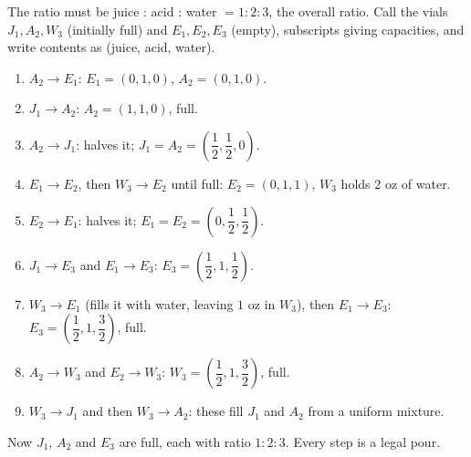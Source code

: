 The ratio must be juice : acid : water $=1:2:3$, the overall ratio. Call the vials $J_1,A_2,W_3$ (initially full) and $E_1,E_2,E_3$ (empty), subscripts giving capacities, and write contents as (juice, acid, water).
\begin{enumerate}
\item $A_2\to E_1$: $E_1=(0,1,0)$, $A_2=(0,1,0)$.
\item $J_1\to A_2$: $A_2=(1,1,0)$, full.
\item $A_2\to J_1$: halves it; $J_1=A_2=(\dfrac12,\dfrac12,0)$.
\item $E_1\to E_2$, then $W_3\to E_2$ until full: $E_2=(0,1,1)$, $W_3$ holds $2$ oz of water.
\item $E_2\to E_1$: halves it; $E_1=E_2=(0,\dfrac12,\dfrac12)$.
\item $J_1\to E_3$ and $E_1\to E_3$: $E_3=(\dfrac12,1,\dfrac12)$.
\item $W_3\to E_1$ (fills it with water, leaving $1$ oz in $W_3$), then $E_1\to E_3$: $E_3=(\dfrac12,1,\dfrac32)$, full.
\item $A_2\to W_3$ and $E_2\to W_3$: $W_3=(\dfrac12,1,\dfrac32)$, full.
\item $W_3\to J_1$ and then $W_3\to A_2$: these fill $J_1$ and $A_2$ from a uniform mixture.
\end{enumerate}
Now $J_1$, $A_2$ and $E_3$ are full, each with ratio $\boxed{1:2:3}$. Every step is a legal pour.
